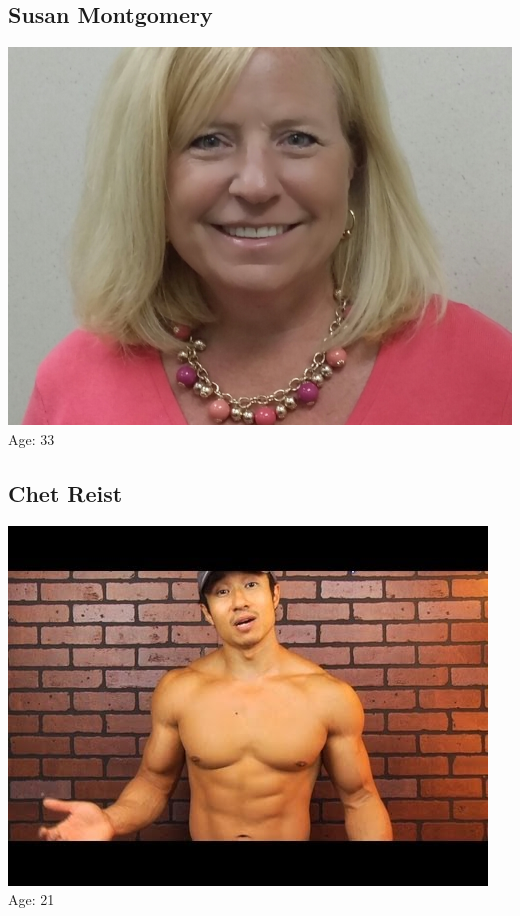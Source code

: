 \documentclass[a4paper,12pt]{article}
\begin{document}
\subsection{Susan Montgomery}
\includegraphics[scale=0.23]{Susan.jpg}
Age: 33\\
\subsection{Chet Reist}
\includegraphics[scale=0.38]{Chet.jpg}
Age: 21\\
\end{document}
